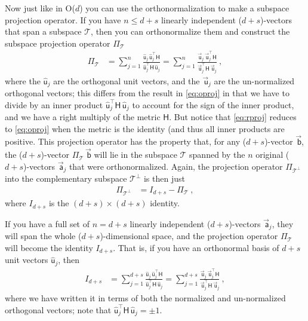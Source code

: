 \documentclass{article}
\newcommand{\metric}{\mathsf{H}}
\newcommand{\proj}{\mathsf{\Pi}}
\newcommand\upvec[1]{\!\vec{\,\mathrm{#1}}}
\newcommand{\Lvec}[1]{\upvec{\mathsf{#1}}} %
\newcommand{\Lhat}[1]{\hat{\mathsf{#1}}} %
\newcommand{\plus}{\!+\!} %
\begin{document}
Now just like in O($d$) you can use the orthonormalization to make a subspace projection operator.
If you have $n\leq d+s$ linearly independent ($d\plus s$)-vectors that span a subspace $\mathscr{T}$, then you can orthonormalize them and construct the subspace projection operator $\proj_\mathscr{T}$
\begin{align}\label{eq:rproj}
    \proj_\mathscr{T} &= \sum_{j=1}^n \frac{\Lhat{u}_j\,\Lhat{u}_j^\top\metric}{\Lhat{u}_j^\top\metric\,\Lhat{u}_j} = \sum_{j=1}^n \frac{\Lvec{u}_j\,\Lvec{u}_j^\top\metric}{\Lvec{u}_j^\top\metric\,\Lvec{u}_j} ~,
\end{align}
where the $\Lhat{u}_j$ are the orthogonal unit vectors, and the $\Lvec{u}_j$ are the un-normalized orthogonal vectors; this differs from the result in \eqref{eq:oproj} in that we have to divide by an inner product $\Lhat{u}_j^\top\metric\,\Lhat{u}_j$ to account for the sign of the inner product, and we have a right multiply of the metric $\metric$.
But notice that \eqref{eq:rproj} reduces to \eqref{eq:oproj} when the metric is the identity (and thus all inner products are positive.
This projection operator has the property that, for any ($d\plus s$)-vector $\Lvec{b}$, the ($d\plus s$)-vector $\proj_\mathscr{T}\,\Lvec{b}$ will lie in the subspace $\mathscr{T}$ spanned by the $n$ original ($d\plus s$)-vectors $\Lvec{a}_j$ that were orthonormalized.
Again, the projection operator $\proj_{\mathscr{T}^\perp}$ into the complementary subspace $\mathscr{T}^\perp$ is then just
\begin{align}\label{eq:lprojcomp}
    \proj_{\mathscr{T}^\perp} &= I_{d+s} - \proj_\mathscr{T} ~,
\end{align}
where $I_{d+s}$ is the $(d+s)\times(d+s)$ identity.

If you have a full set of $n=d+s$ linearly independent ($d\plus s$)-vectors $\Lvec{a}_j$, they will span the whole ($d\plus s$)-dimensional space, and the projection operator $\proj_\mathscr{T}$ will become the identity $I_{d+s}$.
That is, if you have an orthonormal basis of $d+s$ unit vectors $\Lhat{u}_j$, then
\begin{align}
    I_{d+s} &= \sum_{j=1}^{d+s} \frac{\Lhat{u}_j\,\Lhat{u}_j^\top\metric}{\Lhat{u}_j^\top\metric\,\Lhat{u}_j} = \sum_{j=1}^{d+s} \frac{\Lvec{u}_j\,\Lvec{u}_j^\top\metric}{\Lvec{u}_j^\top\metric\,\Lvec{u}_j} \label{eq:Lidentity} ~,
\end{align}
where we have written it in terms of both the normalized and un-normalized orthogonal vectors; note that $\Lhat{u}_j^\top\metric\,\Lhat{u}_j=\pm 1$.
\end{document}
